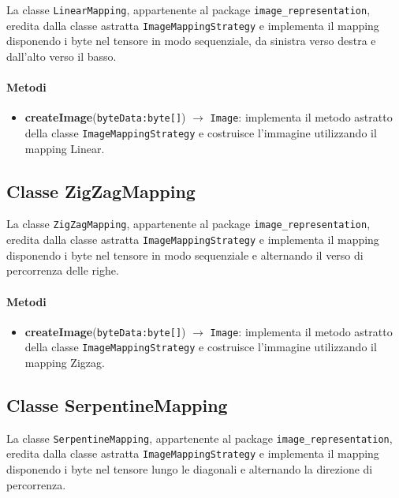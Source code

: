 La classe \texttt{LinearMapping}, appartenente al package
\texttt{image\_representation}, eredita dalla classe astratta
\texttt{ImageMappingStrategy} e implementa il mapping disponendo i byte nel
tensore in modo sequenziale, da sinistra verso destra e dall’alto
verso il basso.

\paragraph{Metodi}

\begin{itemize}
    \raggedright
    \item \textbf{createImage}(\texttt{byteData:byte[]}) $\rightarrow$
    \texttt{Image}: implementa il metodo astratto della classe
    \texttt{ImageMappingStrategy} e costruisce l’immagine utilizzando il
    mapping Linear.
\end{itemize}

\subsection{Classe ZigZagMapping}

La classe \texttt{ZigZagMapping}, appartenente al package
\texttt{image\_representation}, eredita dalla classe astratta
\texttt{ImageMappingStrategy} e implementa il mapping disponendo i byte
nel tensore in modo sequenziale e alternando il verso di percorrenza delle
righe.

\paragraph{Metodi}

\begin{itemize}
    \raggedright
    \item \textbf{createImage}(\texttt{byteData:byte[]}) $\rightarrow$
    \texttt{Image}: implementa il metodo astratto della classe
    \texttt{ImageMappingStrategy} e costruisce l’immagine utilizzando il
    mapping Zigzag.
\end{itemize}

\subsection{Classe SerpentineMapping}

La classe \texttt{SerpentineMapping}, appartenente al package
\texttt{image\_representation}, eredita dalla classe astratta
\texttt{ImageMappingStrategy} e implementa il mapping disponendo i byte
nel tensore lungo le diagonali e alternando la direzione di percorrenza.


